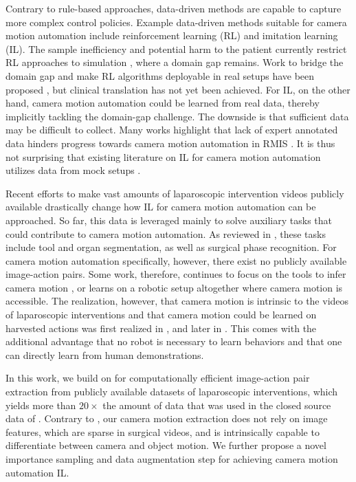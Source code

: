 Contrary to rule-based approaches, data-driven methods are capable to capture more complex control 
policies.
Example data-driven methods suitable for camera motion automation include reinforcement learning (RL) and imitation learning (IL). The sample inefficiency and potential harm to the patient currently restrict RL approaches to simulation \cite{su2021multicamera,scheikl2023lapgym,agrawal2018automating}, where a domain gap remains. Work to bridge the domain gap and make RL algorithms deployable in real setups have been proposed \cite{cartucho2021visionblender,marzullo2021towards}, but clinical translation has not yet been achieved. For IL, on the other hand, camera motion automation could be learned from real data, thereby implicitly tackling the domain-gap challenge. The downside is that sufficient data may be difficult to collect. Many works highlight that lack of expert annotated data hinders progress towards camera motion automation in RMIS \cite{maier2022surgical,kassahun2016surgical,esteva2019guide}.
It is thus not surprising that existing literature on IL for camera motion automation utilizes data from mock setups \cite{ji2018learning,wagner2021learning}.

Recent efforts to make vast amounts of laparoscopic intervention videos publicly available \cite{maier2022surgical} drastically change how IL for camera motion automation can be approached. So far, this data is leveraged mainly to solve auxiliary tasks that could contribute to camera motion automation. As reviewed in \cite{loukas2018video}, these tasks include tool and organ segmentation, as well as surgical phase recognition. For camera motion automation specifically, however, there exist no publicly available image-action pairs. Some work, therefore, continues to focus on the tools to infer camera motion \cite{li2021data}, or learns on a robotic setup altogether \cite{li20223d} where camera motion is accessible. The realization, however, that camera motion is intrinsic to the videos of laparoscopic interventions and that camera motion could be learned on harvested actions was first realized in \cite{huber2022deep}, and later in \cite{li2022learning}. This comes with the additional advantage that no robot is necessary to learn behaviors and that one can directly learn from human demonstrations.

In this work, we build on \cite{huber2022deep} for computationally efficient image-action pair extraction from publicly available datasets of laparoscopic interventions, which yields more than $20\times$ the amount of data that was used in the closed source data of \cite{li2022learning}. Contrary to \cite{li2022learning}, our camera motion extraction does not rely on image features, which are sparse in surgical videos, and is intrinsically capable to differentiate between camera and object motion. We further propose a novel importance sampling and data augmentation step for achieving camera motion automation IL.

